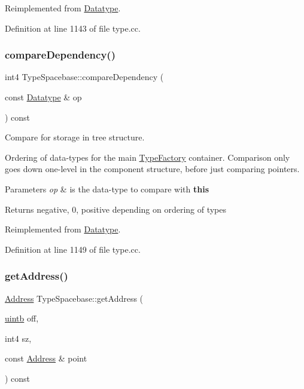 Reimplemented from \mbox{\hyperlink{class_datatype_a4d5a102b2d909180c3080fdb55d7b305}{Datatype}}.



Definition at line 1143 of file type.\+cc.

\mbox{\label{class_type_spacebase_ae0bea6eed65dda9a50999bf664c70c3d}} 
\subsubsection{\texorpdfstring{compareDependency()}{compareDependency()}}
{\footnotesize\ttfamily int4 Type\+Spacebase\+::compare\+Dependency (\begin{DoxyParamCaption}\item[{const \mbox{\hyperlink{class_datatype}{Datatype}} \&}]{op }\end{DoxyParamCaption}) const\hspace{0.3cm}{\ttfamily [virtual]}}



Compare for storage in tree structure. 

Ordering of data-\/types for the main \mbox{\hyperlink{class_type_factory}{Type\+Factory}} container. Comparison only goes down one-\/level in the component structure, before just comparing pointers. 
\begin{DoxyParams}{Parameters}
{\em op} & is the data-\/type to compare with {\bfseries{this}} \\
\hline
\end{DoxyParams}
\begin{DoxyReturn}{Returns}
negative, 0, positive depending on ordering of types 
\end{DoxyReturn}


Reimplemented from \mbox{\hyperlink{class_datatype_ab26e4ca2c3091d3c5a34b4fbd7be76ae}{Datatype}}.



Definition at line 1149 of file type.\+cc.

\mbox{\label{class_type_spacebase_a06a6a2b993228d5619dd00ed65ebac16}} 
\subsubsection{\texorpdfstring{getAddress()}{getAddress()}}
{\footnotesize\ttfamily \mbox{\hyperlink{class_address}{Address}} Type\+Spacebase\+::get\+Address (\begin{DoxyParamCaption}\item[{\mbox{\hyperlink{types_8h_a2db313c5d32a12b01d26ac9b3bca178f}{uintb}}}]{off,  }\item[{int4}]{sz,  }\item[{const \mbox{\hyperlink{class_address}{Address}} \&}]{point }\end{DoxyParamCaption}) const}



